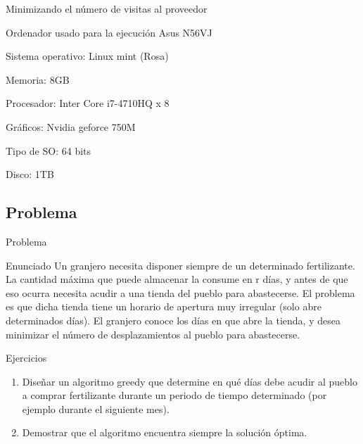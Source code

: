 \begin{frame}{Minimizando el número de visitas al proveedor}
	\begin{alertblock}{Ordenador usado para la ejecuci\'on}
	Asus N56VJ

	Sistema operativo: Linux mint (Rosa)

	Memoria: 8GB

	Procesador: Inter Core i7-4710HQ x 8

	Gráficos: Nvidia geforce 750M

	Tipo de SO: 64 bits

	Disco: 1TB
	\end{alertblock}
\end{frame}


\subsection{Problema}
\begin{frame}{Problema}
\begin{block}{\small Enunciado}
{\small Un granjero necesita disponer siempre de un determinado fertilizante. La cantidad máxima que puede almacenar la consume en r días, y antes de que eso ocurra necesita acudir a una tienda del pueblo para abastecerse. El problema es que dicha tienda tiene un horario de apertura muy irregular (solo abre determinados días). El granjero conoce los días en que abre la tienda, y desea minimizar el número de desplazamientos al pueblo para abastecerse.}\\
\end{block}

\begin{block}{\small Ejercicios}
\begin{enumerate}
\item {\small Diseñar un algoritmo greedy que determine en qué días debe acudir al pueblo a comprar fertilizante durante un periodo de tiempo determinado (por ejemplo durante el siguiente mes).}\\
\item {\small Demostrar que el algoritmo encuentra siempre la solución  óptima.}\\
\end{enumerate}
\end{block}
\end{frame}


